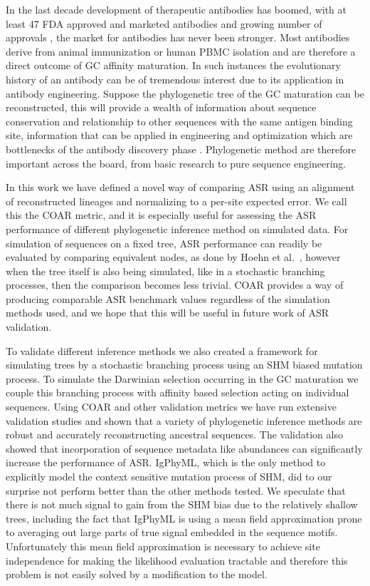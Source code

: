 In the last decade development of therapeutic antibodies has boomed, with at least 47 FDA approved and marketed antibodies and growing number of approvals \cite{ecker2015therapeutic}, the market for antibodies has never been stronger.
Most antibodies derive from animal immunization or human PBMC isolation \cite{reichert2012marketed} and are therefore a direct outcome of GC affinity maturation.
In such instances the evolutionary history of an antibody can be of tremendous interest due to its application in antibody engineering.
Suppose the phylogenetic tree of the GC maturation can be reconstructed, this will provide a wealth of information about sequence conservation and relationship to other sequences with the same antigen binding site, information that can be applied in engineering and optimization which are bottlenecks of the antibody discovery phase \cite{dubel2014handbook}.
Phylogenetic method are therefore important across the board, from basic research to pure sequence engineering.

In this work we have defined a novel way of comparing ASR using an alignment of reconstructed lineages and normalizing to a per-site expected error.
We call this the COAR metric, and it is especially useful for assessing the ASR performance of different phylogenetic inference method on simulated data.
For simulation of sequences on a fixed tree, ASR performance can readily be evaluated by comparing equivalent nodes, as done by Hoehn et al.\ \cite{Hoehn2016-wg}, however when the tree itself is also being simulated, like in a stochastic branching processes, then the comparison becomes less trivial.
COAR provides a way of producing comparable ASR benchmark values regardless of the simulation methods used, and we hope that this will be useful in future work of ASR validation.

To validate different inference methods we also created a framework for simulating trees by a stochastic branching process using an SHM biased mutation process.
To simulate the Darwinian selection occurring in the GC maturation we couple this branching process with affinity based selection acting on individual sequences.
Using COAR and other validation metrics we have run extensive validation studies and shown that a variety of phylogenetic inference methods are robust and accurately reconstructing ancestral sequences.
The validation also showed that incorporation of sequence metadata like abundances can significantly increase the performance of ASR.
IgPhyML, which is the only method to explicitly model the context sensitive mutation process of SHM, did to our surprise not perform better than the other methods tested.
We speculate that there is not much signal to gain from the SHM bias due to the relatively shallow trees, including the fact that IgPhyML is using a mean field approximation prone to averaging out large parts of true signal embedded in the sequence motifs.
Unfortunately this mean field approximation is necessary to achieve site independence for making the likelihood evaluation tractable and therefore this problem is not easily solved by a modification to the model.

